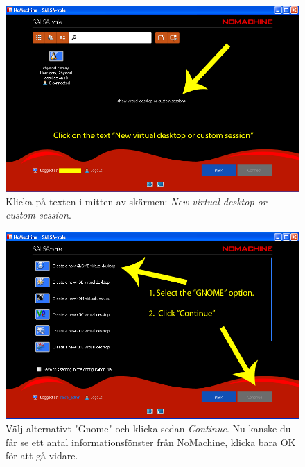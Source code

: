\begin{figure}[H]
    \centering
    \includegraphics[height=0.25\paperheight]{../figures/nomachinefigs/fig7_session.png}
    \caption{Klicka på texten i mitten av skärmen: \emph{New virtual desktop or custom session}. }
    \label{fig:session}
\end{figure}
\begin{figure}[H]
    \centering
    \includegraphics[height=0.25\paperheight]{../figures/nomachinefigs/fig8_gnome.png}
    \caption{Välj alternativt "Gnome" och klicka sedan \emph{Continue}. Nu kanske du får se ett antal informationsfönster från NoMachine, klicka bara OK för att gå vidare. 
}
    \label{fig:gnome}
\end{figure}

